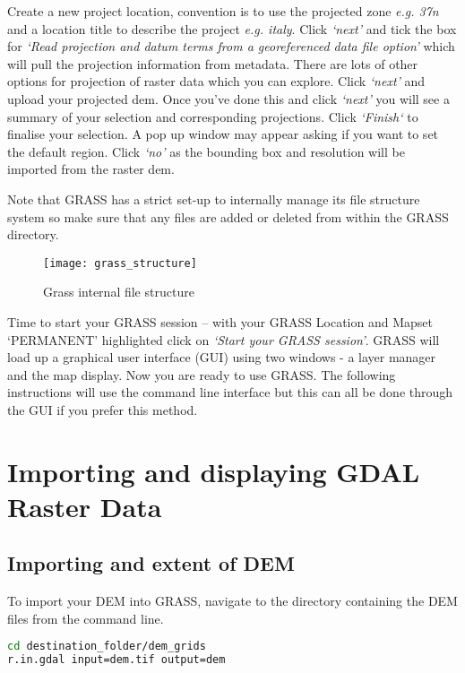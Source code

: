 Create a new project location, convention is to use the projected zone \emph{e.g. 37n} and a location title to describe the project \emph{e.g. italy}. Click \emph{`next'} and tick the box for \emph{`Read projection and datum terms from a georeferenced data file option’} which will pull the projection information from metadata. There are lots of other options for projection of raster data which you can explore. Click \emph{`next'} and upload your projected dem. Once you’ve done this and click \textit{`next'} you will see a summary of your selection and corresponding projections. Click \textit{`Finish`} to finalise your selection. A pop up window may appear asking if you want to set the default region. Click \textit{`no'} as the bounding box and resolution will be imported from the raster dem. 

\noindent Note that GRASS has a strict set-up to internally manage its file structure system so make sure that any files are added or deleted from within the GRASS directory. 

\begin{figure}[h]
\centering
\texttt{[image: grass\_structure]}
\caption{Grass internal file structure}
\end{figure}

Time to start your GRASS session – with your GRASS Location and Mapset `PERMANENT’ highlighted click on \emph{`Start your GRASS session'}. GRASS will load up a graphical user interface (GUI) using two windows - a layer manager and the map display. Now you are ready to use GRASS. The following instructions will use the command line interface but this can all be done through the GUI if you prefer this method. 

\section{Importing and displaying GDAL Raster Data}

\subsection*{Importing and extent of DEM}

To import your DEM into GRASS, navigate to the directory containing the DEM files from the command line. 

\begin{lstlisting}[language=bash]
cd destination_folder/dem_grids
r.in.gdal input=dem.tif output=dem
\end{lstlisting}


